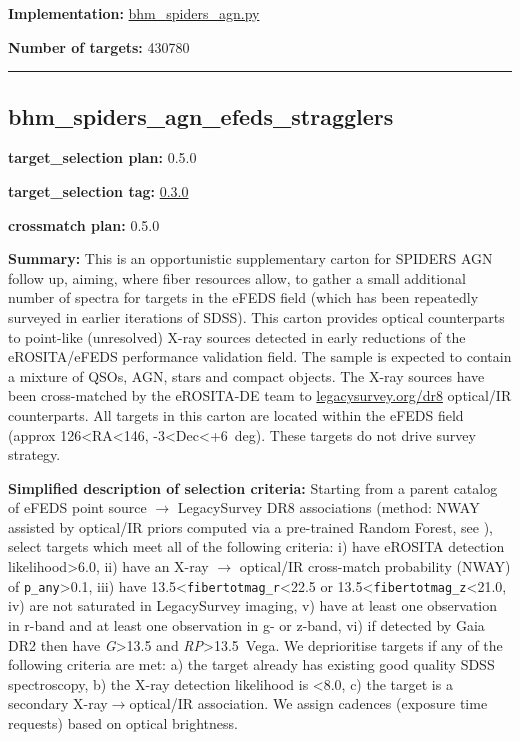 \noindent\textbf{Implementation:}
\href{https://github.com/sdss/target_selection/blob/0.3.0/python/target_selection/cartons/bhm_spiders_agn.py}{bhm\_spiders\_agn.py}

\noindent\textbf{Number of targets:} 430780

\begin{center}\rule{0.5\linewidth}{0.5pt}\end{center}

\hypertarget{bhm_spiders_agn_efeds_stragglers_plan0.5.0}{%
\subsection{bhm\_spiders\_agn\_efeds\_stragglers}\label{bhm_spiders_agn_efeds_stragglers_plan0.5.0}}

\noindent\textbf{target\_selection plan:} 0.5.0

\noindent\textbf{target\_selection tag:}
\href{https://github.com/sdss/target_selection/tree/0.3.0/}{0.3.0}

\noindent\textbf{crossmatch plan:} 0.5.0

\noindent\textbf{Summary:} This is an opportunistic supplementary carton for
SPIDERS AGN follow up, aiming, where fiber resources allow, to gather a
small additional number of spectra for targets in the eFEDS field (which
has been repeatedly surveyed in earlier iterations of SDSS). This carton
provides optical counterparts to point-like (unresolved) X-ray sources
detected in early reductions of the eROSITA/eFEDS performance validation
field. The sample is expected to contain a mixture of QSOs, AGN, stars
and compact objects. The X-ray sources have been cross-matched by the
eROSITA-DE team to
\href{https://www.legacysurvey.org/dr8/}{legacysurvey.org/dr8}
optical/IR counterparts. All targets in this carton are located within
the eFEDS field (approx 126\textless RA\textless146,
-3\textless Dec\textless+6~deg). These targets do not drive survey
strategy.

\noindent\textbf{Simplified description of selection criteria:} Starting from a
parent catalog of eFEDS point source $\rightarrow$ LegacySurvey DR8 associations
(method: NWAY assisted by optical/IR priors computed via a pre-trained
Random Forest, see
\citealt{Salvato2022}), select targets which meet all of the following criteria:
i) have eROSITA detection likelihood\textgreater6.0, ii) have an X-ray $\rightarrow$
optical/IR cross-match probability (NWAY) of
\texttt{p\_any}\textgreater0.1, iii) have
13.5\textless{}\texttt{fibertotmag\_r}\textless22.5 or
13.5\textless{}\texttt{fibertotmag\_z}\textless21.0, iv) are not
saturated in LegacySurvey imaging, v) have at least one observation in
r-band and at least one observation in g- or z-band, vi) if detected by
Gaia DR2 then have \emph{G}\textgreater13.5 and
\emph{RP}\textgreater13.5~Vega. We deprioritise targets if any of the
following criteria are met: a) the target already has existing good
quality SDSS spectroscopy, b) the X-ray detection likelihood is
\textless8.0, c) the target is a secondary X-ray$\rightarrow$optical/IR association.
We assign cadences (exposure time requests) based on optical brightness.


